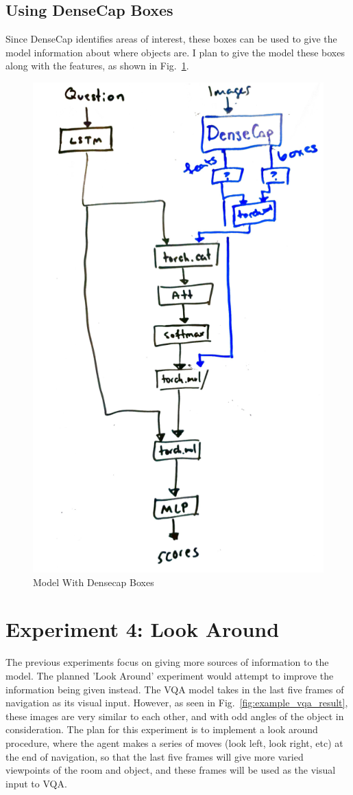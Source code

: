 \subsection{Using DenseCap Boxes}
Since DenseCap identifies areas of interest, these boxes can be used to give the model information about where objects are. I plan to give the model these boxes along with the features, as shown in Fig.~\ref{fig:densecap_boxes}. 


\begin{figure}[h]
     \centering
     \includegraphics[width=.5\textwidth]{./figure/densecapboxes.png}
     \caption{Model With Densecap Boxes}
     \label{fig:densecap_boxes}
\end{figure}

\section{Experiment 4: Look Around}
The previous experiments focus on giving more sources of information to the model. The planned 'Look Around' experiment would attempt to improve the information being given instead. The VQA model takes in the last five frames of navigation as its visual input. However, as seen in Fig.~\ref{fig:example_vqa_result}, these images are very similar to each other, and with odd angles of the object in consideration. The plan for this experiment is to implement a look around procedure, where the agent makes a series of moves (look left, look right, etc) at the end of navigation, so that the last five frames will give more varied viewpoints of the room and object, and these frames will be used as the visual input to VQA.

